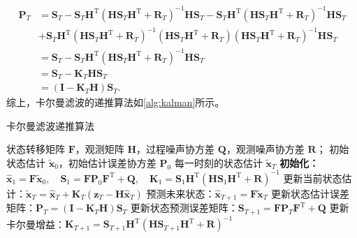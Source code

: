 \[
    \begin{split}
        \mathbf{P}_T & = \mathbf{S}_T - \mathbf{S}_T \mathbf{H}^{\mathrm{T}} \left( \mathbf{H} \mathbf{S}_T \mathbf{H}^{\mathrm{T}} + \mathbf{R}_T \right)^{-1} \mathbf{H} \mathbf{S}_T - \mathbf{S}_T \mathbf{H}^{\mathrm{T}} (\mathbf{H} \mathbf{S}_T \mathbf{H}^{\mathrm{T}} + \mathbf{R}_T )^{-1} \mathbf{H} \mathbf{S}_T \\
                     & + \mathbf{S}_T \mathbf{H}^{\mathrm{T}} (\mathbf{H} \mathbf{S}_T \mathbf{H}^{\mathrm{T}} + \mathbf{R}_T )^{-1} (\mathbf{H} \mathbf{S}_T \mathbf{H}^{\mathrm{T}} + \mathbf{R}_T ) (\mathbf{H} \mathbf{S}_T \mathbf{H}^{\mathrm{T}} + \mathbf{R}_T )^{-1} \mathbf{H} \mathbf{S}_T                         \\
                     & = \mathbf{S}_T - \mathbf{S}_T \mathbf{H}^{\mathrm{T}} \left( \mathbf{H} \mathbf{S}_T \mathbf{H}^{\mathrm{T}} + \mathbf{R}_T \right)^{-1} \mathbf{H} \mathbf{S}_T                                                                                                                                       \\
                     & = \mathbf{S}_T - \mathbf{K}_T \mathbf{H} \mathbf{S}_T                                                                                                                                                                                                                                                  \\
                     & = (\mathbf{I} - \mathbf{K}_T \mathbf{H}) \mathbf{S}_T.
    \end{split}
\]
综上，卡尔曼滤波的递推算法如\cref{alg:kalman}所示。

\begin{algorithm}[htb!]
    \caption{卡尔曼滤波递推算法}
    \label{alg:kalman}
    \begin{algorithmic}[1]
        \Require
        状态转移矩阵 $\mathbf{F}$，观测矩阵 $\mathbf{H}$，过程噪声协方差 $\mathbf{Q}$，观测噪声协方差 $\mathbf{R}$；
        初始状态估计 $\tilde{\bm{x}}_{0}$，初始估计误差协方差 $\mathbf{P}_{0}$
        \Ensure
        每一时刻的状态估计 $\tilde{\bm{x}}_{T}$
        \State \textbf{初始化：} \(\hat{\bm{x}}_{1} = \mathbf{F} \tilde{\bm{x}}_{0}, \quad \mathbf{S}_{1} = \mathbf{F} \mathbf{P}_0 \mathbf{F}^{\mathrm{T}} + \mathbf{Q}, \quad \mathbf{K}_{1} = \mathbf{S}_{1} \mathbf{H}^{\mathrm{T}} \left( \mathbf{H} \mathbf{S}_{1} \mathbf{H}^{\mathrm{T}} + \mathbf{R} \right)^{-1}\)
        \State 更新当前状态估计：\( \tilde{\bm{x}}_T = \hat{\bm{x}}_T + \mathbf{K}_T \left( \bm{z}_T - \mathbf{H} \hat{\bm{x}}_{T} \right) \)
        \State 预测未来状态：\( \hat{\bm{x}}_{T+1} = \mathbf{F} \tilde{\bm{x}}_T \)
        \State 更新状态估计误差矩阵：\( \mathbf{P}_T = (\mathbf{I} - \mathbf{K}_T \mathbf{H}) \mathbf{S}_T \)
        \State 更新状态预测误差矩阵：\( \mathbf{S}_{T+1} = \mathbf{F} \mathbf{P}_T \mathbf{F}^{\mathrm{T}} + \mathbf{Q} \)
        \State 更新卡尔曼增益：\( \mathbf{K}_{T+1} = \mathbf{S}_{T+1} \mathbf{H}^{\mathrm{T}} \left( \mathbf{H} \mathbf{S}_{T+1} \mathbf{H}^{\mathrm{T}} + \mathbf{R} \right)^{-1} \)
        \EndFor
    \end{algorithmic}
\end{algorithm}

